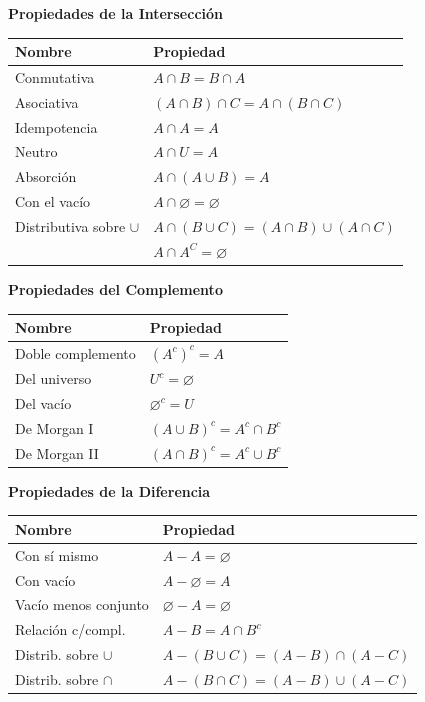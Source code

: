 \documentclass[12pt]{article}
\begin{document}
\bigskip

{\large\bfseries Propiedades de la Intersección}

\begin{tabularx}{\linewidth}{@{}lX@{}}
\toprule
\textbf{Nombre} & \textbf{Propiedad} \\ \midrule
Conmutativa & $A \cap B = B \cap A$ \\
Asociativa  & $(A \cap B)\cap C = A \cap (B \cap C)$ \\
Idempotencia & $A \cap A = A$ \\
Neutro      & $A \cap U = A$ \\
Absorción   & $A \cap (A \cup B) = A$ \\
Con el vacío & $A \cap \varnothing = \varnothing$ \\
Distributiva sobre $\cup$ & $A \cap (B \cup C) = (A \cap B) \cup (A \cap C)$ \\
& $A\cap A^C=\varnothing$\\
\bottomrule
\end{tabularx}

{\large\bfseries Propiedades del Complemento}

\begin{tabularx}{\linewidth}{@{}lX@{}}
\toprule
\textbf{Nombre} & \textbf{Propiedad} \\ \midrule
Doble complemento & $(A^c)^c = A$ \\
Del universo      & $U^c = \varnothing$ \\
Del vacío         & $\varnothing^c = U$ \\
De Morgan I       & $(A \cup B)^c = A^c \cap B^c$ \\
De Morgan II      & $(A \cap B)^c = A^c \cup B^c$ \\
\bottomrule
\end{tabularx}

\bigskip

{\large\bfseries Propiedades de la Diferencia}

\begin{tabularx}{\linewidth}{@{}lX@{}}
\toprule
\textbf{Nombre} & \textbf{Propiedad} \\ \midrule
Con sí mismo          & $A - A = \varnothing$ \\
Con vacío             & $A - \varnothing = A$ \\
Vacío menos conjunto  & $\varnothing - A = \varnothing$ \\
Relación c/compl.     & $A - B = A \cap B^c$ \\
Distrib. sobre $\cup$ & $A - (B \cup C) = (A - B)\cap(A - C)$ \\
Distrib. sobre $\cap$ & $A - (B \cap C) = (A - B)\cup(A - C)$ \\
\bottomrule
\end{tabularx}
\end{document}
